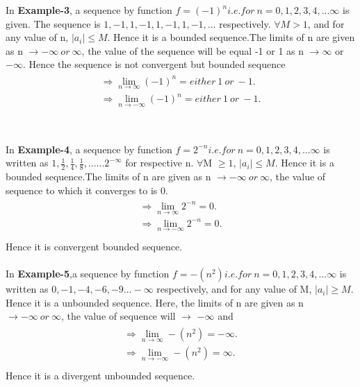 \documentclass[a4paper]{article}
\begin{document}
In \textbf{Example-3}, a sequence by function $f=(-1)^n i.e. for\ n=0, 1 ,2,3,4,...\infty$ is given. The sequence is $1,-1,1,-1,1,-1,1,-1,...$ respectively. $\forall M > 1$, and for any value of n, $\mid a_i \mid \leq M $. Hence it is a bounded sequence.The limits of n are given as n $\to -\infty\ or\ \infty$, the value of the sequence will be equal -1 or 1 as n $\to \infty$ or $-\infty$. Hence the sequence is not convergent but bounded sequence
\begin{align}
\begin{split}
\Rightarrow \lim_{n \to \infty} (-1)^n = either \  1 \ or\ -1.\\
\Rightarrow \lim_{n \to -\infty} (-1)^n = either \  1 \ or\ -1.
\\
\end{split}
\end{align}
\\
\\
In \textbf{Example-4}, a sequence by function $f=2^{-n} i.e. for\ n=0, 1 ,2,3,4,...\infty$ is written as $1,\frac{1}{2},\frac{1}{4},\frac{1}{8},......2^{-\infty}$ for respective n. $\forall$M $\geq 1$, $\mid a_i \mid \leq M $. Hence it is a bounded sequence.The limits of n are given as n $\to -\infty\ or\ \infty$, the value of sequence to which it converges to is 0. 
\begin{align}
\begin{split}
\Rightarrow \lim_{n \to \infty} 2^{-n} = 0.\\
\Rightarrow \lim_{n \to -\infty} 2^{-n} = 0.
\\
\end{split}
\end{align}
Hence it is convergent bounded sequence.
\\
\\
In \textbf{Example-5},a sequence by function $f=-(n^2) i.e. for\ n=0, 1 ,2,3,4,...\infty$ is written as $0,-1,-4,-6,-9...-\infty$ respectively, and for any value of M, $\mid a_i \mid \geq M $. Hence it is a unbounded sequence. Here, the limits of n are given as n $\to -\infty\ or\ \infty$, the value of sequence will $\to$ $-\infty$ and
\begin{align}
\begin{split}
\Rightarrow \lim_{n \to \infty} -(n^2) = -\infty.\\
\Rightarrow \lim_{n \to -\infty} -(n^2) = \infty.
\\
\end{split}
\end{align}
Hence it is a divergent unbounded sequence.
\end{document}
